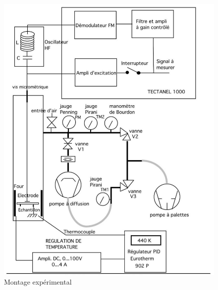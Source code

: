 
\begin{figure}
    \vspace{-1cm}
    \centering
    \includegraphics[width=\linewidth]{figures/montage.png}
    \caption{Montage expérimental \cite{notice}}
    \label{fig:montage}
    \vspace{-1cm}
\end{figure}


